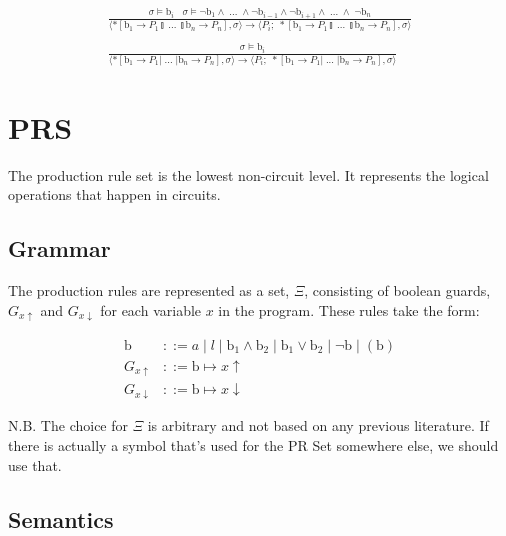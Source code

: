 \documentclass[times,10pt]{article}
\begin{document}
\begin{align*}
\frac{\sigma \models \textrm{b}_i \;\;\; \sigma \models \lnot \mathrm{b}_1 \wedge \; ... \; \wedge \lnot \mathrm{b}_{i-1} \wedge \lnot \mathrm{b}_{i+1} \wedge \; ... \; \wedge \; \lnot\mathrm{b}_n } {\langle *[ \mathrm{b}_1 \rightarrow P_1  \talloblong \; ... \; \talloblong \mathrm{b}_n \rightarrow P_n ] , \sigma \rangle \rightarrow \langle P_i; \; *[ \mathrm{b}_1 \rightarrow P_1  \talloblong \; ... \; \talloblong \mathrm{b}_n \rightarrow P_n ] , \sigma\rangle  } \\
\\ \frac{\sigma \models \textrm{b}_i} {\langle *[ \mathrm{b}_1 \rightarrow P_1  | \; ... \; | \mathrm{b}_n \rightarrow P_n ] , \sigma \rangle \rightarrow \langle P_i;\;*[ \mathrm{b}_1 \rightarrow P_1  | \; ... \; | \mathrm{b}_n \rightarrow P_n ] , \sigma\rangle  }
\end{align*}
\section{PRS}

The production rule set is the lowest non-circuit level.  It represents the logical operations that happen in circuits. 

\subsection{Grammar}

The production rules are represented as a set, $\Xi$, consisting of boolean guards, $G_{x\uparrow}$ and $G_{x\downarrow}$ for each variable $x$ in the program.  These rules take the form:

\begin{align*}
\mathrm{b} & ::= a \; | \; \mathit{l} \; | \; \mathrm{b} _1 \wedge \mathrm{b}_2 \; | \; \mathrm{b}_1 \vee \mathrm{b}_2 \; | \; \lnot \mathrm{b} \; | \; ( \mathrm{b} ) \\
G_{x\uparrow} &::= \mathrm{b} \mapsto x\uparrow  \\
G_{x\downarrow} &::= \mathrm{b} \mapsto x\downarrow 
\end{align*}

N.B. The choice for $\Xi$ is arbitrary and not based on any previous literature.  If there is actually a symbol that's used for the PR Set somewhere else, we should use that.

\subsection{Semantics}
\end{document}
